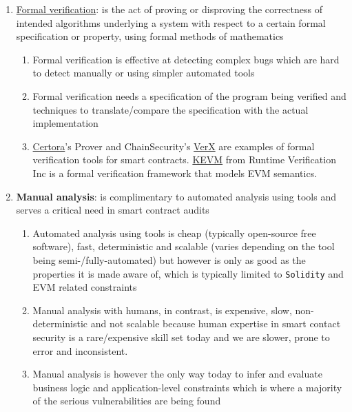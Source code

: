 \begin{enumerate}
\item\href{https://en.wikipedia.org/wiki/Formal\_verification}{Formal verification}: is the act of proving or disproving the correctness of intended algorithms underlying a system with respect to a certain formal specification or property, using formal methods of mathematics
	\begin{enumerate}
	\item Formal verification is effective at detecting complex bugs which are hard to detect manually or using simpler automated tools
	\item Formal verification needs a specification of the program being verified and techniques to translate/compare the specification with the actual implementation
	\item\href{https://www.certora.com/}{Certora}’s Prover and ChainSecurity’s \href{http://verx.ch/}{VerX} are examples of formal verification tools for smart contracts. \href{https://github.com/kframework/evm-semantics}{KEVM} from Runtime Verification Inc is a formal verification framework that models EVM semantics.
	\end{enumerate}

\item\textbf{Manual analysis}: is complimentary to automated analysis using tools and serves a critical need in smart contract audits
	\begin{enumerate}
	\item Automated analysis using tools is cheap (typically open-source free software), fast, deterministic and scalable (varies depending on the tool being semi-/fully-automated) but however is only as good as the properties it is made aware of, which is typically limited to \verb|Solidity| and EVM related constraints
	\item Manual analysis with humans, in contrast, is expensive, slow, non-deterministic and not scalable because human expertise in smart contact security is a rare/expensive skill set today and we are slower, prone to error and inconsistent.
	\item Manual analysis is however the only way today to infer and evaluate business logic and application-level constraints which is where a majority of the serious vulnerabilities are being found
	\end{enumerate}


\end{enumerate}
